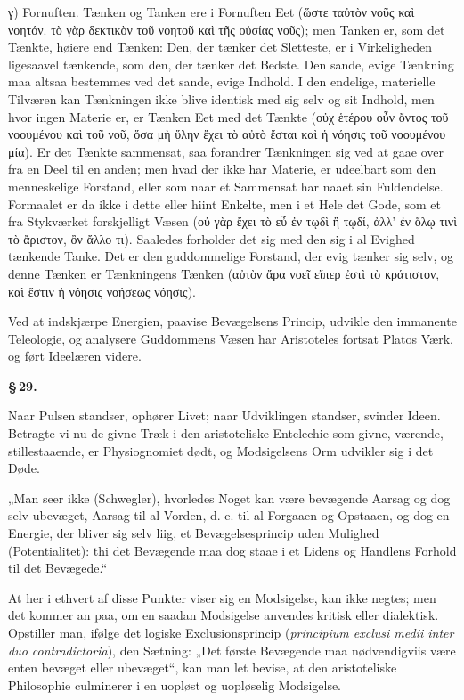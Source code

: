 \documentclass[12pt]{book}
\newcommand{\opage}[1]{\marginnote{\footnotesize\textit{[#1]}}}
\begin{document}
γ) Fornuften. Tænken og Tanken ere i Fornuften Eet (ὥστε ταὐτὸν νοῦς καὶ νοητόν. τὸ γὰρ δεκτικὸν
τοῦ νοητοῦ καὶ τῆς οὐσίας νοῦς); men Tanken er, som det Tænkte, høiere end Tænken: Den, der tænker
det Sletteste, er i Virkeligheden ligesaavel tænkende, som den, der tænker det Bedste. Den sande,
evige Tænkning maa altsaa bestemmes ved det sande, evige Indhold. I den endelige, materielle
Tilværen kan Tænkningen ikke blive identisk med sig selv og sit Indhold, men hvor ingen Materie
er, er Tænken Eet med det Tænkte (οὐχ ἑτέρου οὖν ὄντος τοῦ νοουμένου καὶ τοῦ νοῦ, ὅσα μὴ ὕλην ἔχει
τὸ αὐτὸ ἔσται καὶ ἡ νόησις τοῦ νοουμένου μία). Er det Tænkte sammensat, saa forandrer Tænkningen
sig ved at gaae over fra en Deel til en anden; men hvad der ikke har Materie, er udeelbart som
den menneskelige Forstand, eller som naar et Sammensat har naaet sin Fuldendelse. Formaalet er da
ikke i dette eller hiint Enkelte, men i et Hele det Gode, som et fra Stykværket forskjelligt
Væsen (οὐ γὰρ ἔχει τὸ εὖ ἐν τῳδὶ ἢ τῳδί, ἀλλ' ἐν ὅλῳ τινὶ τὸ ἄριστον, ὂν ἄλλο τι). Saaledes
forholder det
\opage{148} sig med den sig i al Evighed tænkende Tanke. Det er den guddommelige Forstand, der evig tænker
sig selv, og denne Tænken er Tænkningens Tænken (αὐτὸν ἄρα νοεῖ εἴπερ ἐστὶ τὸ κράτιστον, καὶ ἔστιν
ἡ νόησις νοήσεως νόησις).

Ved at indskjærpe Energien, paavise Bevægelsens Princip, udvikle den immanente Teleologie, og
analysere Guddommens Væsen har Aristoteles fortsat Platos Værk, og ført Ideelæren videre.

\begin{center}{\bfseries \S\,29.}\end{center}

Naar Pulsen standser, ophører Livet; naar Udviklingen standser, svinder Ideen. Betragte vi nu de
givne Træk i den aristoteliske Entelechie som givne, værende, stillestaaende, er Physiognomiet
dødt, og Modsigelsens Orm udvikler sig i det Døde.

„Man seer ikke (Schwegler), hvorledes Noget kan være bevægende Aarsag og dog selv ubevæget,
Aarsag til al Vorden, d. e. til al Forgaaen og Opstaaen, og dog en Energie, der bliver sig selv
liig, et Bevægelsesprincip uden Mulighed (Potentialitet): thi det Bevægende maa dog staae i et
Lidens og Handlens Forhold til det Bevægede.“

At her i ethvert af disse Punkter viser sig en Modsigelse, kan ikke negtes; men det kommer an
paa, om en saadan Modsigelse anvendes kritisk eller dialektisk. Opstiller man, ifølge det logiske
Exclusionsprincip (\textit{principium exclusi medii inter duo contradictoria}), den Sætning:
„Det første Bevægende maa nødvendigviis være enten bevæget eller ubevæget“, kan man let bevise,
at den aristoteliske Philosophie culminerer i en uopløst og uopløselig Modsigelse.
\end{document}
